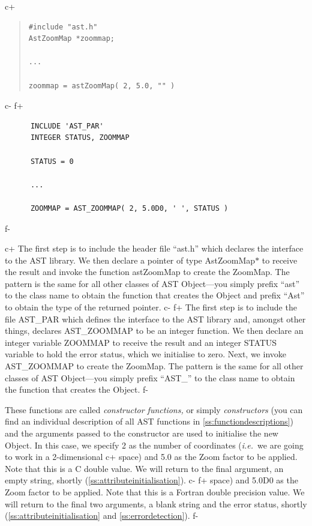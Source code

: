 \documentclass[twoside,11pt]{article}
\newcommand{\appref}[1]{Appendix~\ref{#1}}
\newcommand{\secref}[1]{\S\ref{#1}}
\renewcommand{\appref}[1]{\ref{#1}}
\renewcommand{\secref}[1]{\ref{#1}}
\begin{document}
c+
\begin{quote}
\small
\begin{verbatim}
#include "ast.h"
AstZoomMap *zoommap;

...

zoommap = astZoomMap( 2, 5.0, "" )
\end{verbatim}
\normalsize
\end{quote}
c-
f+
\small
\begin{verbatim}
      INCLUDE 'AST_PAR'
      INTEGER STATUS, ZOOMMAP

      STATUS = 0

      ...

      ZOOMMAP = AST_ZOOMMAP( 2, 5.0D0, ' ', STATUS )
\end{verbatim}
\normalsize
f-

c+
The first step is to include the header file ``ast.h'' which declares
the interface to the AST library.  We then declare a pointer of type
AstZoomMap$*$ to receive the result and invoke the function astZoomMap
to create the ZoomMap. The pattern is the same for all other classes
of AST Object---you simply prefix ``ast'' to the class name to obtain
the function that creates the Object and prefix ``Ast'' to obtain the
type of the returned pointer.
c-
f+
The first step is to include the file AST\_PAR which defines the
interface to the AST library and, amongst other things, declares
AST\_ZOOMMAP to be an integer function.  We then declare an integer
variable ZOOMMAP to receive the result and an integer STATUS variable
to hold the error status, which we initialise to zero. Next, we invoke
AST\_ZOOMMAP to create the ZoomMap. The pattern is the same for all
other classes of AST Object---you simply prefix ``AST\_'' to the class
name to obtain the function that creates the Object.
f-

These functions are called {\em{constructor functions,}} or simply
{\em{constructors}} (you can find an individual description of all AST
functions in \appref{ss:functiondescriptions}) and the arguments
passed to the constructor are used to initialise the new Object. In
this case, we specify 2 as the number of coordinates ({\em{i.e.}}\ we
are going to work in a 2-dimensional
c+
space) and 5.0 as the Zoom factor to be applied. Note that this is a C
double value. We will return to the final argument, an empty string,
shortly (\secref{ss:attributeinitialisation}).
c-
f+
space) and 5.0D0 as the Zoom factor to be applied. Note that this is a
Fortran double precision value. We will return to the final two
arguments, a blank string and the error status, shortly
(\secref{ss:attributeinitialisation} and \secref{ss:errordetection}).
f-
\end{document}

